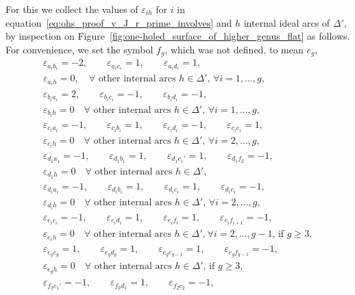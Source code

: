\documentclass[pdftex]{sigma}
\numberwithin{equation}{section}
\theoremstyle{definition}
\begin{document}
For this we collect the values of $\varepsilon_{ih}$ for $i$ in equation~\eqref{eq:ohs_proof_v_J_r_prime_involves} and $h$ internal ideal arcs of $\Delta'$, by inspection on Figure~\ref{fig:one-holed_surface_of_higher_genus_flat} as follows. For convenience, we set the symbol $f_g$, which was not defined, to mean $e_g$,
\begin{gather*}
\varepsilon_{a_i b_i} =-2, \qquad
\varepsilon_{a_i c_i} = 1, \qquad
\varepsilon_{a_i d_i} = 1, \\
\varepsilon_{a_i h}=0, \quad\mbox{$\forall$ other internal arcs $h\in \Delta'$, $\forall i=1,\dots,g$}, \\
 \varepsilon_{b_i a_i} =2, \qquad
\varepsilon_{b_i c_i} = -1, \qquad
\varepsilon_{b_i d_i}=-1,\\
\varepsilon_{b_i h}=0 \quad\mbox{$\forall$ other internal arcs $h\in \Delta'$, $\forall i=1,\dots,g$}, \\
 \varepsilon_{c_i a_i} = -1, \qquad
\varepsilon_{c_i b_i} = 1, \qquad
\varepsilon_{c_i d_i} = -1, \qquad
\varepsilon_{c_i e_i} = 1, \\
\varepsilon_{c_i h}=0 \quad \mbox{$\forall$ other internal arcs $h\in \Delta'$, $\forall i=2,\dots,g$}, \\
 \varepsilon_{d_1 a_1} = -1,\qquad
\varepsilon_{d_1 b_1}=1,\qquad
\varepsilon_{d_1 c_1'}=1,\qquad
\varepsilon_{d_1 f_2}=-1,\\
\varepsilon_{d_1 h}=0 \quad \mbox{$\forall$ other internal arcs $h\in \Delta'$}, \\
 \varepsilon_{d_i a_i}=-1,\qquad
\varepsilon_{d_i b_i}=1,\qquad
\varepsilon_{d_i c_i}=1,\qquad
\varepsilon_{d_i e_i}=-1,\\
\varepsilon_{d_i h}=0 \quad \mbox{$\forall$ other internal arcs $h\in \Delta'$, $\forall i=2,\dots,g$}, \\
 \varepsilon_{e_i c_i}=-1,\qquad
\varepsilon_{e_i d_i}=1,\qquad
\varepsilon_{e_i f_i}=1,\qquad
\varepsilon_{e_i f_{i+1}}=-1,\\
\varepsilon_{e_i h}=0 \quad \mbox{$\forall$ other internal arcs $h\in \Delta'$,} \
 \mbox{$\forall i=2,\dots,g-1$, if $g\ge 3$}, \\
 \varepsilon_{e_g c_g}=1,\qquad
\varepsilon_{e_g d_g}=1,\qquad
\varepsilon_{e_g e_{g-1}}=1,\qquad
\varepsilon_{e_g f_{g-1}}=-1,\\
\varepsilon_{e_g h}=0\quad \mbox{$\forall$ other internal arcs $h\in \Delta'$, if $g\ge 3$}, \\
 \varepsilon_{f_2 c_1'}=-1,\qquad
\varepsilon_{f_2 d_1}=1,\qquad
\varepsilon_{f_2 c_2}=-1,\qquad

\end{gather*}
\end{document}
